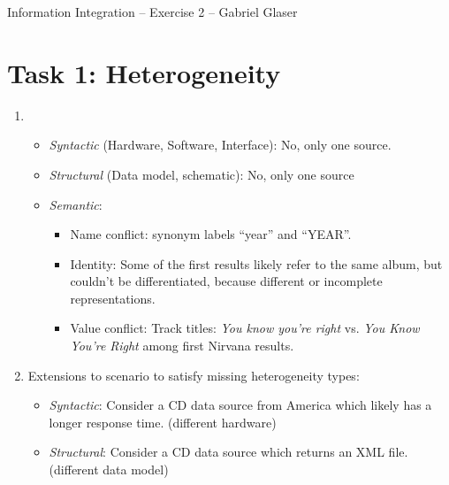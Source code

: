 \documentclass{scrartcl}
\begin{document}
	\begin{center}
		\LARGE
		Information Integration -- Exercise 2 -- Gabriel Glaser
	\end{center}
	\vspace{1cm}
	\section*{Task 1: Heterogeneity}
	\begin{enumerate}
		\item 
		\begin{itemize}
			\item \textit{Syntactic} (Hardware, Software, Interface): No, only one source.
			
			\item \textit{Structural} (Data model, schematic): No, only one source
			
			\item \textit{Semantic}:
			\begin{itemize}
				\item Name conflict: synonym labels \enquote{year} and \enquote{YEAR}.
				\item Identity: Some of the first results likely refer to the same album, but couldn't be differentiated, because different or incomplete representations.
				\item Value conflict: Track titles: \textit{You know you're right} vs. \textit{You Know You're Right} among first Nirvana results.
			\end{itemize}
			
		\end{itemize}
	
		\item Extensions to scenario to satisfy missing heterogeneity types:
		\begin{itemize}
			\item \textit{Syntactic}: Consider a CD data source from America which likely has a longer response time. (different hardware)
			
			\item \textit{Structural}: Consider a CD data source which returns an XML file. (different data model)
		\end{itemize}
	\end{enumerate}
	
\end{document}
